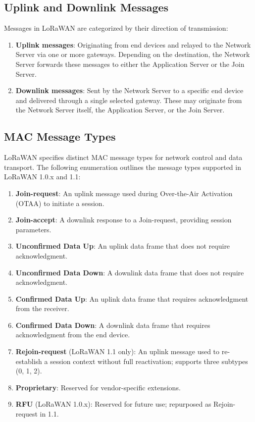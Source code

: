 \subsection{Uplink and Downlink Messages}

Messages in LoRaWAN are categorized by their direction of transmission:

\begin{enumerate}
    \item \textbf{Uplink messages}: Originating from end devices and relayed to the Network Server via one or more gateways. Depending on the destination, the Network Server forwards these messages to either the Application Server or the Join Server.
    \item \textbf{Downlink messages}: Sent by the Network Server to a specific end device and delivered through a single selected gateway. These may originate from the Network Server itself, the Application Server, or the Join Server.
\end{enumerate}

\subsection{MAC Message Types}

LoRaWAN specifies distinct MAC message types for network control and data transport. The following enumeration outlines the message types supported in LoRaWAN 1.0.x and 1.1:

\begin{enumerate}
    \item \textbf{Join-request}: An uplink message used during Over-the-Air Activation (OTAA) to initiate a session.
    \item \textbf{Join-accept}: A downlink response to a Join-request, providing session parameters.
    \item \textbf{Unconfirmed Data Up}: An uplink data frame that does not require acknowledgment.
    \item \textbf{Unconfirmed Data Down}: A downlink data frame that does not require acknowledgment.
    \item \textbf{Confirmed Data Up}: An uplink data frame that requires acknowledgment from the receiver.
    \item \textbf{Confirmed Data Down}: A downlink data frame that requires acknowledgment from the end device.
    \item \textbf{Rejoin-request} (LoRaWAN 1.1 only): An uplink message used to re-establish a session context without full reactivation; supports three subtypes (0, 1, 2).
    \item \textbf{Proprietary}: Reserved for vendor-specific extensions.
    \item \textbf{RFU} (LoRaWAN 1.0.x): Reserved for future use; repurposed as Rejoin-request in 1.1.
\end{enumerate}

